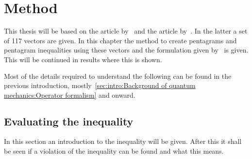 \chapter{Method}\label{cha:Covering the sphere with noncontextuality inequalities}
This thesis will be based on the article by~\cite{PhysRevLett.101.020403} and the article by~\cite{Kochen1968The}. In the latter a set of 117 vectors are given. In this chapter the method to create pentagrams and pentagram inequalities using these vectors and the formulation given by~\cite{PhysRevLett.101.020403} is given.  This will be continued in results where this is shown.

Most of the details required to understand the following can be found in the previous introduction, mostly~\ref{sec:intro:Background of quantum mechanics:Operator formalism} and onward.
 
\newpage
\section{Evaluating the inequality}\label{sec:Covering the sphere with noncontextuality inequalities:Evaluating the inequality}
In this section an introduction to the inequality will be given. After this it shall be seen if a violation of the inequality can be found and what this means. 

